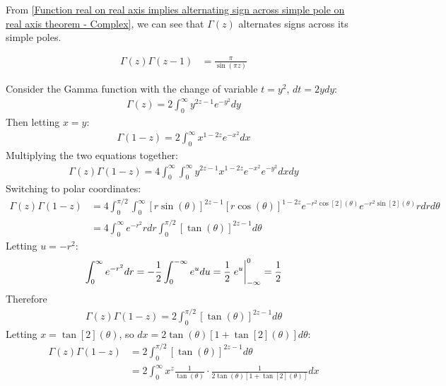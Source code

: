 \documentclass[12pt, english]{book}
\makeatletter
\renewenvironment{proof}[1][\proofname]{\par
	\pushQED{\qed}%
	\normalfont \topsep6\p@\@plus6\p@\relax
	\list{}{%
		\settowidth{\leftmargin}{\itshape\proofname:\hskip\labelsep}%
		\setlength{\labelwidth}{0pt}%
		\setlength{\itemindent}{-\leftmargin}%
		}%
	\item[\hskip\labelsep\itshape#1\@addpunct{:}]\ignorespaces
	}{\popQED\endlist\@endpefalse}
\makeatother
\begin{document}
	From \cref{Function real on real axis implies alternating sign across simple pole on real axis theorem - Complex}, we can see that \(\Gamma(z)\) alternates signs across its simple poles.
	
	\begin{theorem}
		\label{Gamma Function Reflection Formula - Complex}
		\begin{align*}
			\Gamma(z) \Gamma(z-1) &= \frac{\pi}{\sin(\pi z)}
		\end{align*}
	\end{theorem}
	\begin{proof}
		Consider the Gamma function with the change of variable \(t = y^2\), \(dt = 2ydy\):
		\begin{align*}
			\Gamma(z) = 2 \int_{0}^{\infty} y^{2z-1} e^{-y^2} dy
		\end{align*}
		Then letting \(x = y\):
		\begin{align*}
			\Gamma(1-z) = 2 \int_{0}^{\infty} x^{1-2z} e^{-x^2} dx
		\end{align*}
		Multiplying the two equations together:
		\begin{align*}
			\Gamma(z) \Gamma(1-z)
			= 4 \int_{0}^{\infty} \int_{0}^{\infty} 
				y^{2z-1} x^{1-2z} e^{-x^2} e^{-y^2} dx dy
		\end{align*}
		Switching to polar coordinates:
		\begin{align*}
			\Gamma(z) \Gamma(1-z)
			&= 4 \int_{0}^{\pi/2} \int_{0}^{\infty} [r\sin(\theta)]^{2z-1} [r\cos(\theta)]^{1-2z} e^{-r^2 \cos[2](\theta)} e^{-r^2 \sin[2](\theta)} rdr d\theta \\
			&= 4 \int_{0}^{\infty} e^{-r^2} rdr \int_{0}^{\pi/2}[\tan(\theta)]^{2z-1} d\theta
		\end{align*}
		Letting \(u = -r^2\):
		\begin{align*}
			\int_{0}^{\infty} e^{-r^2} dr 
			= -\frac{1}{2} \int_{0}^{-\infty} e^u du
			= \frac{1}{2} \eval{e^u}_{-\infty}^{0} = \frac{1}{2}
		\end{align*}
		Therefore
		\begin{align*}
			\Gamma(z) \Gamma(1-z) = 2\int_{0}^{\pi/2} [\tan(\theta)]^{2z-1} d\theta
		\end{align*}
		Letting \(x = \tan[2](\theta)\), so \(dx = 2\tan(\theta)[1+\tan[2](\theta)] d\theta\):
		\begin{align*}
			\Gamma(z) \Gamma(1-z) 
			&= 2\int_{0}^{\pi/2} [\tan(\theta)]^{2z-1} d\theta  \\
			&= 2 \int_{0}^{\infty} x^z \frac{1}{\tan(\theta)} \cdot \frac{1}{2\tan(\theta)[1+\tan[2](\theta)]} dx \\

\end{align*}
\end{proof}
\end{document}
